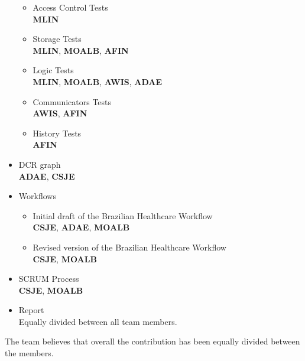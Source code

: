 \begin{itemize}
\begin{itemize}
		\item Access Control Tests\\
		\textbf{MLIN}
		\item Storage Tests\\
		\textbf{MLIN}, \textbf{MOALB}, \textbf{AFIN}
		\item Logic Tests\\
		\textbf{MLIN}, \textbf{MOALB}, \textbf{AWIS}, \textbf{ADAE}
		\item Communicators Tests\\
		\textbf{AWIS}, \textbf{AFIN}
		\item History Tests\\
		\textbf{AFIN}
	\end{itemize}
	\item DCR graph\\
	\textbf{ADAE}, \textbf{CSJE}
	\item Workflows
	\begin{itemize}
		\item Initial draft of the Brazilian Healthcare Workflow\\
		\textbf{CSJE}, \textbf{ADAE}, \textbf{MOALB}
		\item Revised version of the Brazilian Healthcare Workflow\\
		\textbf{CSJE}, \textbf{MOALB}
	\end{itemize}
	\item SCRUM Process\\
	\textbf{CSJE}, \textbf{MOALB}
	\item Report\\
	Equally divided between all team members.
\end{itemize}

The team believes that overall the contribution has been equally divided between the members.


